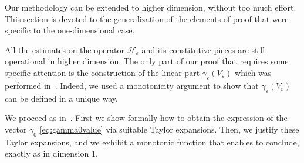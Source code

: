 \documentclass[JEP,XML,SOM,Unicode]{cedram}
\let\mathcal\mathscr
\theoremstyle{plain}
\theoremstyle{definition}
\renewcommand{\H}{\mathcal{H}_\eps}
\let\eps\varepsilon
\begin{document}
Our methodology can be extended to higher dimension, without too much effort.
This section is devoted to the generalization of the elements of proof that were specific to the one-dimensional case.

All the estimates on the operator $\H$ and its constitutive pieces are still operational in higher dimension. The only part of our proof that requires some specific attention is the construction of the linear part $\gamma_\eps(V_\eps)$ which was performed in~. Indeed, we used a monotonicity argument to show that $\gamma_\eps(V_\eps)$ can be defined in a unique way.

We proceed as in~.
First we show formally how to obtain the expression of the vector $\gamma_0$ \eqref{eq:gamma0value} via suitable Taylor expansions. Then, we justify these Taylor expansions, and we exhibit a monotonic function that enables to conclude, exactly as in dimension 1.
\end{document}
